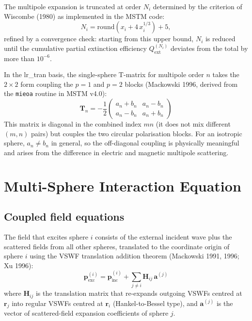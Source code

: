 \documentclass[11pt,a4paper]{article}
\begin{document}
The multipole expansion is truncated at order $N_i$ determined by the criterion of Wiscombe (1980) as implemented in the MSTM code:
\begin{equation}
  N_i = \mathrm{round}\!\left(x_i + 4\,x_i^{1/3}\right) + 5,
  \label{eq:nstop}
\end{equation}
refined by a convergence check: starting from this upper bound, $N_i$ is reduced until the cumulative partial extinction efficiency $Q_\mathrm{ext}^{(N_i)}$ deviates from the total by more than $10^{-6}$.

In the lr\_tran basis, the single-sphere T-matrix for multipole order $n$ takes the $2 \times 2$ form coupling the $p = 1$ and $p = 2$ blocks (Mackowski 1996, derived from the \texttt{mieoa} routine in MSTM v4.0):
\begin{equation}
  \mathbf{T}_n = -\frac{1}{2}
  \begin{pmatrix} a_n + b_n & a_n - b_n \\ a_n - b_n & a_n + b_n \end{pmatrix}
  \label{eq:tmatrix-lr}
\end{equation}
This matrix is diagonal in the combined index $mn$ (it does not mix different $(m,n)$ pairs) but couples the two circular polarisation blocks.
For an isotropic sphere, $a_n \neq b_n$ in general, so the off-diagonal coupling is physically meaningful and arises from the difference in electric and magnetic multipole scattering.

\section{Multi-Sphere Interaction Equation}
\label{sec:multi-sphere}

\subsection{Coupled field equations}

The field that excites sphere $i$ consists of the external incident wave plus the scattered fields from all other spheres, translated to the coordinate origin of sphere $i$ using the VSWF translation addition theorem (Mackowski 1991, 1996; Xu 1996):
\begin{equation}
  \bm{p}_\mathrm{exc}^{(i)} = \bm{p}_\mathrm{inc}^{(i)} + \sum_{j \neq i} \mathbf{H}_{ij}\,\bm{a}^{(j)}
  \label{eq:exciting-field}
\end{equation}
where $\mathbf{H}_{ij}$ is the translation matrix that re-expands outgoing VSWFs centred at $\bm{r}_j$ into regular VSWFs centred at $\bm{r}_i$ (Hankel-to-Bessel type), and $\bm{a}^{(j)}$ is the vector of scattered-field expansion coefficients of sphere $j$.
\end{document}
